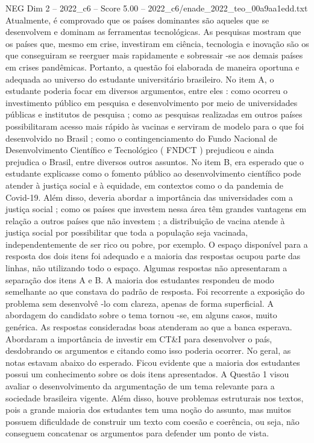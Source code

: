 \begin{textsample}{NEG Dim 2 – 2022\_c6 – Score 5.00 – 2022\_c6/enade\_2022\_teo\_00a9aa1edd.txt}
Atualmente, é comprovado que os países dominantes são aqueles que se desenvolvem e dominam as ferramentas tecnológicas.
As pesquisas mostram que os países que, mesmo em crise, investiram em ciência, tecnologia e inovação são os que conseguiram se reerguer mais rapidamente e sobressair -se aos demais países em crises pandêmicas.
Portanto, a questão foi elaborada de maneira oportuna e adequada ao universo do estudante universitário brasileiro.
No item A, o estudante poderia focar em diversos argumentos, entre eles : como ocorreu o investimento público em pesquisa e desenvolvimento por meio de universidades públicas e institutos de pesquisa ; como as pesquisas realizadas em outros países possibilitaram acesso mais rápido às vacinas e serviram de modelo para o que foi desenvolvido no Brasil ; como o contingenciamento do Fundo Nacional de Desenvolvimento Científico e Tecnológico ( FNDCT ) prejudicou e ainda prejudica o Brasil, entre diversos outros assuntos.
No item B, era esperado que o estudante explicasse como o fomento público ao desenvolvimento científico pode atender à justiça social e à equidade, em contextos como o da pandemia de Covid-19.
Além disso, deveria abordar a importância das universidades com a justiça social ; como os países que investem nessa área têm grandes vantagens em relação a outros países que não investem ; a distribuição de vacina atende à justiça social por possibilitar que toda a população seja vacinada, independentemente de ser rico ou pobre, por exemplo.
O espaço disponível para a resposta dos dois itens foi adequado e a maioria das respostas ocupou parte das linhas, não utilizando todo o espaço.
Algumas respostas não apresentaram a separação dos itens A e B.
A maioria dos estudantes respondeu de modo semelhante ao que constava do padrão de resposta.
Foi recorrente a exposição do problema sem desenvolvê -lo com clareza, apenas de forma superficial.
A abordagem do candidato sobre o tema tornou -se, em alguns casos, muito genérica.
As respostas consideradas boas atenderam ao que a banca esperava.
Abordaram a importância de investir em CT\&I para desenvolver o país, desdobrando os argumentos e citando como isso poderia ocorrer.
No geral, as notas estavam abaixo do esperado.
Ficou evidente que a maioria dos estudantes possui um conhecimento sobre os dois itens apresentados.
A Questão 1 visou avaliar o desenvolvimento da argumentação de um tema relevante para a sociedade brasileira vigente.
Além disso, houve problemas estruturais nos textos, pois a grande maioria dos estudantes tem uma noção do assunto, mas muitos possuem dificuldade de construir um texto com coesão e coerência, ou seja, não conseguem concatenar os argumentos para defender um ponto de vista.

\end{textsample}
